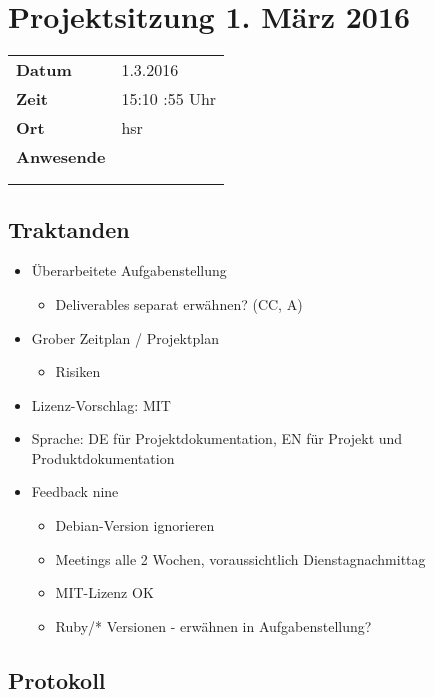 \documentclass[class=scrbook,crop=false]{standalone}
\begin{document}
	
	\section*{Projektsitzung 1. März 2016}
	
	\begin{tabular}{ll}
		\textbf{Datum} & 1.3.2016 \\
		\textbf{Zeit} & 15:10 \textendash 14:55  Uhr \\
		\textbf{Ort} & \acs{hsr} \\
		\textbf{Anwesende} & \proff \\ & \ubos \\ & \pchr
	\end{tabular}
	
	\subsection*{Traktanden}
	\begin{itemize}
		\item Überarbeitete Aufgabenstellung
		\begin{itemize}
    		\item Deliverables separat erwähnen? (CC, A)
    	\end{itemize}
		\item Grober Zeitplan / Projektplan
		\begin{itemize}
    		\item Risiken
    	\end{itemize}
		\item Lizenz-Vorschlag: MIT
		\item Sprache: DE für Projektdokumentation, EN für Projekt und Produktdokumentation
		\item Feedback \gls{nine}
		\begin{itemize}
    		\item Debian-Version ignorieren
    		\item Meetings alle 2 Wochen, voraussichtlich Dienstagnachmittag
    		\item MIT-Lizenz OK
    		\item Ruby/* Versionen - erwähnen in Aufgabenstellung?
    	\end{itemize}
	\end{itemize}
	
	\subsection*{Protokoll}
\end{document}
